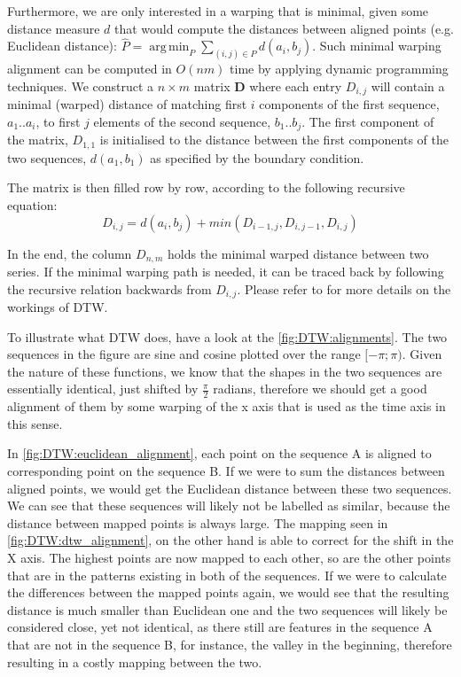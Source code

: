 \documentclass[parskip]{cs4rep}
\DeclareMathOperator*{\argmin}{arg\,min}
\begin{document}
Furthermore, we are only interested in a warping that is minimal, given some distance measure $d$ that would compute the distances between aligned points (e.g. Euclidean distance): $\hat{P} = \argmin_P \sum_{(i,j) \in P} d(a_i, b_j)$. Such minimal warping alignment can be computed in $O(nm)$ time by applying dynamic programming techniques. We construct a $n \times m$ matrix $\mathbf{D}$ where each entry $D_{i,j}$ will contain a minimal (warped) distance of matching first $i$ components of the first sequence, $a_1..a_i$, to first $j$ elements of the second sequence, $b_1..b_j$. The first component of the matrix, $D_{1,1}$ is initialised to the distance between the first components of the two sequences, $d(a_1, b_1)$ as specified by the boundary condition.

The matrix is then filled row by row, according to the following recursive equation:
$$D_{i,j} = d(a_i, b_j) + min(D_{i-1, j}, D_{i, j-1}, D_{i,j})$$

In the end, the column $D_{n,m}$ holds the minimal warped distance between two series.
If the minimal warping path is needed, it can be traced back by following the recursive relation backwards from $D_{i,j}$. Please refer to \citep{Muller:2007bo} for more details on the workings of DTW.

To illustrate what DTW does, have a look at the \autoref{fig:DTW:alignments}. The two sequences in the figure are sine and cosine plotted over the range $[-\pi; \pi)$. Given the nature of these functions, we know that the shapes in the two sequences are essentially identical, just shifted by $\frac{\pi}{2}$ radians, therefore we should get a good alignment of them by some warping of the x axis that is used as the time axis in this sense.

In \autoref{fig:DTW:euclidean_alignment}, each point on the sequence A is aligned to corresponding point on the sequence B. If we were to sum the distances between aligned points, we would get the Euclidean distance between these two sequences. We can see that these sequences will likely not be labelled as similar, because the distance between mapped points is always large. The mapping seen in \autoref{fig:DTW:dtw_alignment}, on the other hand is able to correct for the shift in the X axis. 
The highest points are now mapped to each other, so are the other points that are in the patterns existing in both of the sequences. If we were to calculate the differences between the mapped points again, we would see that the resulting distance is much smaller than Euclidean one and the two sequences will likely be considered close, yet not identical, as there still are features in the sequence A that are not in the sequence B, for instance, the valley in the beginning, therefore resulting in a costly mapping between the two.
\end{document}
